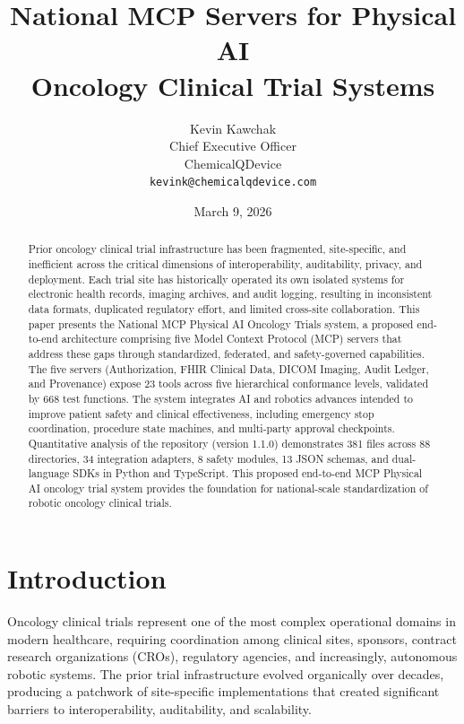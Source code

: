 \documentclass{article}
\title{National MCP Servers for Physical AI\\Oncology Clinical Trial Systems}
\author{
  Kevin Kawchak\hspace{2pt}\orcidicon{0009-0007-5457-8667} \\
  Chief Executive Officer \\
  ChemicalQDevice \\
  \texttt{kevink@chemicalqdevice.com}
}
\date{March 9, 2026}
\begin{document}
\maketitle

\begin{abstract}
Prior oncology clinical trial infrastructure has been fragmented, site-specific, and inefficient across the critical dimensions of interoperability, auditability, privacy, and deployment. Each trial site has historically operated its own isolated systems for electronic health records, imaging archives, and audit logging, resulting in inconsistent data formats, duplicated regulatory effort, and limited cross-site collaboration. This paper presents the National MCP Physical AI Oncology Trials system, a proposed end-to-end architecture comprising five Model Context Protocol (MCP) servers that address these gaps through standardized, federated, and safety-governed capabilities. The five servers (Authorization, FHIR Clinical Data, DICOM Imaging, Audit Ledger, and Provenance) expose 23 tools across five hierarchical conformance levels, validated by 668 test functions. The system integrates AI and robotics advances intended to improve patient safety and clinical effectiveness, including emergency stop coordination, procedure state machines, and multi-party approval checkpoints. Quantitative analysis of the repository (version 1.1.0) demonstrates 381 files across 88 directories, 34 integration adapters, 8 safety modules, 13 JSON schemas, and dual-language SDKs in Python and TypeScript. This proposed end-to-end MCP Physical AI oncology trial system provides the foundation for national-scale standardization of robotic oncology clinical trials.
\end{abstract}


\clearpage
\tableofcontents
\clearpage

\section{Introduction}
\label{sec:introduction}

Oncology clinical trials represent one of the most complex operational domains in modern healthcare, requiring coordination among clinical sites, sponsors, contract research organizations (CROs), regulatory agencies, and increasingly, autonomous robotic systems. The prior trial infrastructure evolved organically over decades, producing a patchwork of site-specific implementations that created significant barriers to interoperability, auditability, and scalability.
\end{document}
